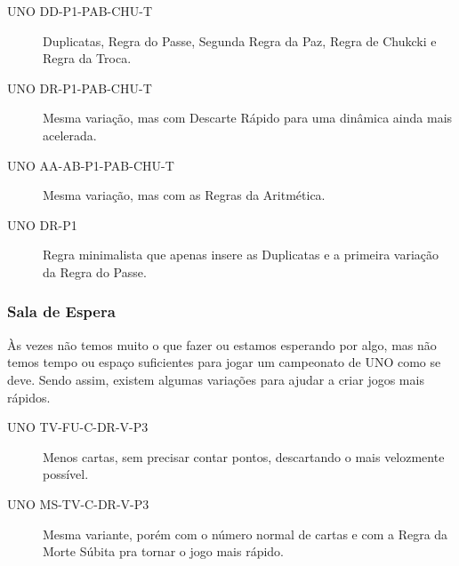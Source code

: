\begin{description}
\item[UNO DD-P1-PAB-CHU-T]{Duplicatas, Regra do Passe, Segunda Regra da Paz, Regra de Chukcki e Regra da Troca.}
\item[UNO DR-P1-PAB-CHU-T]{Mesma variação, mas com Descarte Rápido para uma dinâmica ainda mais acelerada.}
\item[UNO AA-AB-P1-PAB-CHU-T]{Mesma variação, mas com as Regras da Aritmética.}
\item[UNO DR-P1]{Regra minimalista que apenas insere as Duplicatas e a primeira variação da Regra do Passe.}
\end{description}

\subsubsection{Sala de Espera}

Às vezes não temos muito o que fazer ou estamos esperando por algo, mas não temos tempo ou espaço suficientes para jogar um campeonato de UNO como se deve. Sendo assim, existem algumas variações para ajudar a criar jogos mais rápidos.

\begin{description}
\item[UNO TV-FU-C-DR-V-P3]{Menos cartas, sem precisar contar pontos, descartando o mais velozmente possível.}
\item[UNO MS-TV-C-DR-V-P3]{Mesma variante, porém com o número normal de cartas e com a Regra da Morte Súbita pra tornar o jogo mais rápido.}
\end{description}
